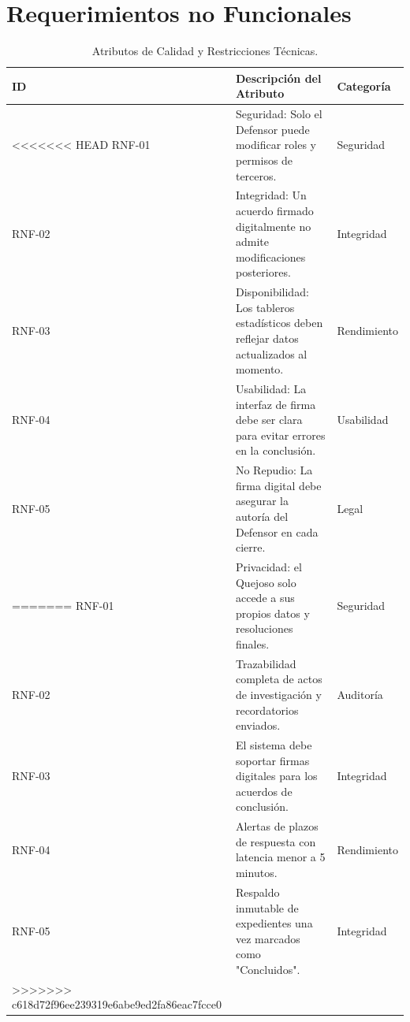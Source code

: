 \section{Requerimientos no Funcionales}
\begin{table}[h!]
\centering
\caption{Atributos de Calidad y Restricciones Técnicas.}
\label{tab:non_func}
\begin{tabular}{@{} l p{9cm} l @{}}
\toprule
\rowcolor[HTML]{2D3E50} 
\textbf{\color[HTML]{FFFFFF} ID} & \textbf{\color[HTML]{FFFFFF} Descripción del Atributo} & \textbf{\color[HTML]{FFFFFF} Categoría} \\ \midrule
\rowcolor[HTML]{F2F4F7} 
<<<<<<< HEAD
RNF-01 & Seguridad: Solo el Defensor puede modificar roles y permisos de terceros. & Seguridad \\
RNF-02 & Integridad: Un acuerdo firmado digitalmente no admite modificaciones posteriores. & Integridad \\
\rowcolor[HTML]{F2F4F7} 
RNF-03 & Disponibilidad: Los tableros estadísticos deben reflejar datos actualizados al momento. & Rendimiento \\
RNF-04 & Usabilidad: La interfaz de firma debe ser clara para evitar errores en la conclusión. & Usabilidad \\
\rowcolor[HTML]{F2F4F7} 
RNF-05 & No Repudio: La firma digital debe asegurar la autoría del Defensor en cada cierre. & Legal \\ \bottomrule
=======
RNF-01 & Privacidad: el Quejoso solo accede a sus propios datos y resoluciones finales. & Seguridad \\
RNF-02 & Trazabilidad completa de actos de investigación y recordatorios enviados. & Auditoría \\
\rowcolor[HTML]{F2F4F7} 
RNF-03 & El sistema debe soportar firmas digitales para los acuerdos de conclusión. & Integridad \\
RNF-04 & Alertas de plazos de respuesta con latencia menor a 5 minutos. & Rendimiento \\
\rowcolor[HTML]{F2F4F7} 
RNF-05 & Respaldo inmutable de expedientes una vez marcados como "Concluidos". & Integridad \\ \bottomrule
>>>>>>> c618d72f96ee239319e6abe9ed2fa86eac7fcce0
\end{tabular}
\end{table}